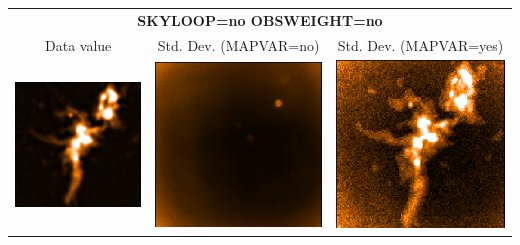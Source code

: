 \vspace{5mm}
\begin{tabular}{|ccc|}
\hline
\multicolumn{3}{|c|}{\textbf{SKYLOOP=no OBSWEIGHT=no}} \\
Data value & Std. Dev. (MAPVAR=no) & Std. Dev. (MAPVAR=yes) \\
\includegraphics[width=\picwid]{tailoring/i1.png} &
\includegraphics[width=\picwid]{tailoring/sqvar1.png} &
\includegraphics[width=\picwid]{tailoring/disp1.png} \\
\hline
\end{tabular}

